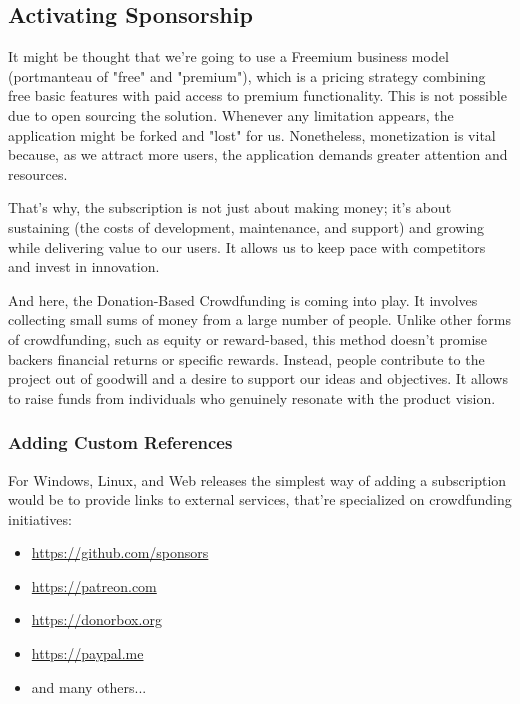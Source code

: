 
\subsection{Activating Sponsorship}

It might be thought that we're going to use a Freemium business model (portmanteau of "free" and "premium"), which is 
a pricing strategy combining free basic features with paid access to premium functionality. This is not possible due to 
open sourcing the solution. Whenever any limitation appears, the application might be forked and "lost" for us. 
Nonetheless, monetization is vital because, as we attract more users, the application demands greater attention and 
resources.

That's why, the subscription is not just about making money; it's about sustaining (the costs of development, 
maintenance, and support) and growing while delivering value to our users. It allows us to keep pace with competitors 
and invest in innovation.

And here, the Donation-Based Crowdfunding is coming into play. It involves collecting small sums of money from a large 
number of people. Unlike other forms of crowdfunding, such as equity or reward-based, this method doesn't promise 
backers financial returns or specific rewards. Instead, people contribute to the project out of goodwill and a desire 
to support our ideas and objectives. It allows to raise funds from individuals who genuinely resonate with the 
product vision.

\subsubsection{Adding Custom References}

For Windows, Linux, and Web releases the simplest way of adding a subscription would be to provide links to external 
services, that're specialized on crowdfunding initiatives:

\begin{itemize}
  \item  \href{https://github.com/sponsors}{https://github.com/sponsors}
  \item  \href{https://patreon.com}{https://patreon.com}
  \item  \href{https://donorbox.org}{https://donorbox.org}
  \item  \href{https://paypal.me}{https://paypal.me}
  \item  and many others...
\end{itemize}

